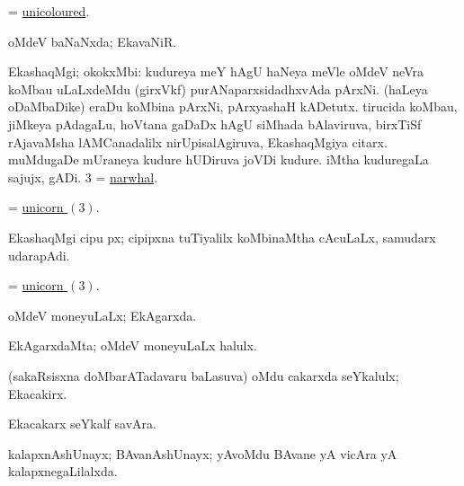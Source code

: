 \bentry
{} 
\gl{\gu}
\expl{}
\bmng
= \hyperlink{unicoloured}{unicoloured}. 
\emng
\eentry

\bentry 
{} 
\gl{\gu}
\expl{}
\bmng
oMdeV baNaNxda; EkavaNiR. 
\emng
\eentry

\bentry
{} 
\gl{\nA}
\bmng
\bnum
{} EkashaqMgi; okokxMbi: 
\banum
{} kudureya meY hAgU haNeya meVle oMdeV neVra koMbau uLaLxdeMdu (girxVkf) purANaparxsidadhxvAda pArxNi.  
 (haLeya oDaMbaDike) eraDu koMbina pArxNi, pArxyashaH kADetutx. 
 tirucida koMbau, jiMkeya pAdagaLu, hoVtana gaDaDx hAgU siMhada bAlaviruva, birxTiSf rAjavaMsha lAMCanadalilx nirUpisalAgiruva, EkashaqMgiya citarx. 
\eanum
\numie
{} 
\banum
{} muMdugaDe mUraneya kudure hUDiruva joVDi kudure. 
 iMtha kuduregaLa sajujx, gADi. 
\hypertarget{unicorn(3)}{} 
\eanum
\numie
\num{3} = \hyperref{kandict_n.pdf}{N}{narwhal}{narwhal}. 
\enum
\emng

\noindent
\gl{\pagu}
\expl{}
\bmng
{} = \hyperlink{unicorn(3)}{unicorn \((3)\)}. 
\emng
\eentry

\bentry
{}
\gl{\nA}
\expl{}
\bmng
EkashaqMgi cipu px; cipipxna tuTiyalilx koMbinaMtha cAcuLaLx, samudarx udarapAdi. 
\emng
\eentry

\bentry
{}
\gl{\nA}
\expl{}
\bmng
= \hyperlink{unicorn(3)}{unicorn \((3)\)}. 
\emng
\eentry

\bentry 
{} 
\gl{\gu}
\expl{}
\bmng
oMdeV moneyuLaLx; EkAgarxda. 
\emng
\eentry

\bentry 
{} 
\gl{\nA}
\expl{}
\bmng
EkAgarxdaMta; oMdeV moneyuLaLx halulx. 
\emng
\eentry

\bentry
{} 
\gl{\nA}
\expl{}
\bmng
(sakaRsisxna doMbarATadavaru baLasuva) oMdu cakarxda seYkalulx; Ekacakirx. 
\emng
\eentry

\bentry
{} 
\gl{\nA}
\expl{}
\bmng
Ekacakarx seYkalf savAra. 
\emng
\eentry

\bentry
{} 
\gl{\gu}
\expl{}
\bmng
kalapxnAshUnayx; BAvanAshUnayx; yAvoMdu BAvane yA vicAra yA kalapxnegaLilalxda. 
\emng
\eentry

